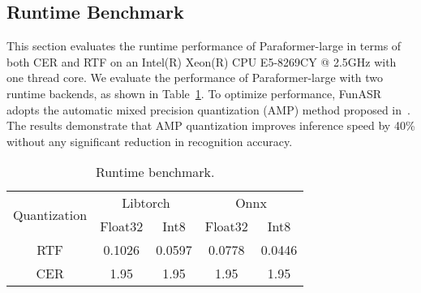 \documentclass{INTERSPEECH2023}
\begin{document}
\begin{table}[h]
    \vspace{-1mm}
    \centering
    \caption{Evaluation of funetuning}
    \vspace{-2mm}
    \label{tab:finetune_res}
    \vspace{-6mm}
\end{table}



\subsection{Runtime Benchmark}

This section evaluates the runtime performance of Paraformer-large in terms of both CER and RTF on an Intel(R) Xeon(R) CPU E5-8269CY @ 2.5GHz with one thread core. We evaluate the performance of Paraformer-large with two runtime backends, as shown in Table~\ref{tab:runtime}. To optimize performance, FunASR adopts the automatic mixed precision quantization (AMP) method proposed in~\cite{gao21f_interspeech,zhu2021disc}.
The results demonstrate that AMP quantization improves inference speed by 40\% without any significant reduction in recognition accuracy.


\begin{table}[h]
    \vspace{-1mm}
    \centering
    \caption{Runtime benchmark.}
    \vspace{-3mm}
    \begin{tabular}{c|cccc}
        \midrule
        \multirow{2}{*}{Quantization} & \multicolumn{2}{c}{Libtorch} & \multicolumn{2}{c}{Onnx} \\
         & Float32 & Int8 & Float32 & Int8 \\
        \midrule
        RTF & 0.1026 & 0.0597 & 0.0778 & 0.0446 \\
        CER & 1.95 & 1.95 & 1.95 & 1.95 \\
        \midrule
    \end{tabular}
    \label{tab:runtime}
    \vspace{-8mm}
\end{table}
\end{document}
